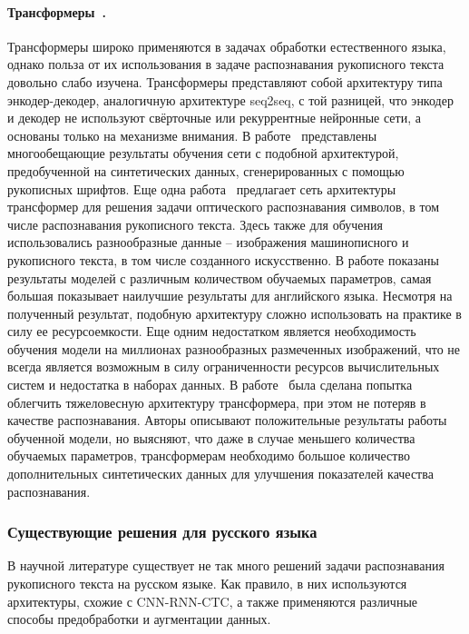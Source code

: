 \paragraph{Трансформеры~\cite{vaswani2017attention}.}{
    Трансформеры широко применяются в задачах обработки естественного языка, однако польза от их использования в
    задаче распознавания рукописного текста довольно слабо изучена.
    Трансформеры представляют собой архитектуру типа энкодер-декодер, аналогичную архитектуре seq2seq, с той разницей,
    что энкодер и декодер не используют свёрточные или рекуррентные нейронные сети, а основаны только на механизме внимания.
    В работе~\cite{kang2022pay} представлены многообещающие результаты обучения сети с подобной архитектурой,
    предобученной на синтетических данных, сгенерированных с помощью рукописных шрифтов.
    Еще одна работа~\cite{li2021trocr} предлагает сеть архитектуры трансформер для решения задачи оптического распознавания символов,
    в том числе распознавания рукописного текста.
    Здесь также для обучения использовались разнообразные данные -- изображения машинописного и рукописного текста,
    в том числе созданного искусственно.
    В работе показаны результаты моделей с различным количеством обучаемых параметров, самая большая показывает наилучшие результаты для английского языка.
    Несмотря на полученный результат, подобную архитектуру сложно использовать на практике в силу ее ресурсоемкости.
    Еще одним недостатком является необходимость обучения модели на миллионах разнообразных размеченных изображений,
    что не всегда является возможным в силу ограниченности ресурсов вычислительных систем и недостатка в наборах данных.
    В работе~\cite{barrere2022light} была сделана попытка облегчить тяжеловесную архитектуру трансформера,
    при этом не потеряв в качестве распознавания.
    Авторы описывают положительные результаты работы обученной модели, но выясняют, что даже в случае меньшего количества обучаемых параметров,
    трансформерам необходимо большое количество дополнительных синтетических данных для улучшения показателей качества распознавания.
}


\subsubsection{Существующие решения для русского языка}
\label{subsubsec:networks-russian}

В научной литературе существует не так много решений задачи распознавания рукописного текста на русском языке.
Как правило, в них используются архитектуры, схожие с CNN-RNN-CTC, а также применяются различные способы предобработки и аугментации данных.

